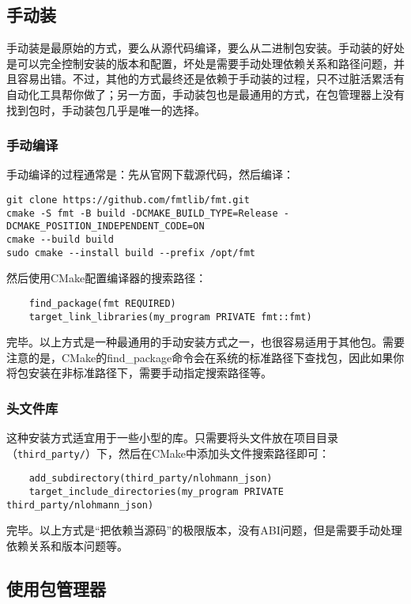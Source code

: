 \subsection{手动装}

手动装是最原始的方式，要么从源代码编译，要么从二进制包安装。手动装的好处是可以完全控制安装的版本和配置，坏处是需要手动处理依赖关系和路径问题，并且容易出错。不过，其他的方式最终还是依赖于手动装的过程，只不过脏活累活有自动化工具帮你做了；另一方面，手动装包也是最通用的方式，在包管理器上没有找到包时，手动装包几乎是唯一的选择。

\subsubsection{手动编译}

手动编译的过程通常是：先从官网下载源代码，然后编译：
\begin{lstlisting}
git clone https://github.com/fmtlib/fmt.git
cmake -S fmt -B build -DCMAKE_BUILD_TYPE=Release -DCMAKE_POSITION_INDEPENDENT_CODE=ON
cmake --build build
sudo cmake --install build --prefix /opt/fmt
\end{lstlisting}

然后使用CMake配置编译器的搜索路径：
\begin{lstlisting}
    find_package(fmt REQUIRED)
    target_link_libraries(my_program PRIVATE fmt::fmt)
\end{lstlisting}

完毕。以上方式是一种最通用的手动安装方式之一，也很容易适用于其他包。需要注意的是，CMake的find\_package命令会在系统的标准路径下查找包，因此如果你将包安装在非标准路径下，需要手动指定搜索路径等。

\subsubsection{头文件库}

这种安装方式适宜用于一些小型的库。只需要将头文件放在项目目录（\texttt{third\_party/}）下，然后在CMake中添加头文件搜索路径即可：
\begin{lstlisting}
    add_subdirectory(third_party/nlohmann_json)
    target_include_directories(my_program PRIVATE third_party/nlohmann_json)
\end{lstlisting}

完毕。以上方式是“把依赖当源码”的极限版本，没有ABI问题，但是需要手动处理依赖关系和版本问题等。

\subsection{使用包管理器}

